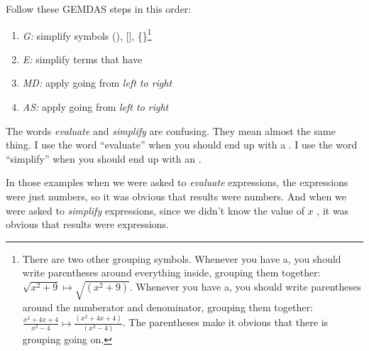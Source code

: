 \documentclass[fleqn,letterpaper,12pt,printwatermark=false]{memoir}
\begin{document}
\begin{myKeyConcepts}
    Follow these GEMDAS steps in this order:
    \begin{enumerate}
        \item {\Large\slshape G:} simplify  symbols (), [], \{\}\footnote{
            There are two other grouping symbols.
            Whenever you have a, you should write parentheses around everything inside, grouping them together:
            $\sqrt{x^2+9} \mapsto \sqrt{(x^2+9)} $.
            Whenever you have a, 
            you should write parentheses around the numberator and denominator, grouping them together:
            $\frac{x^2 + 4x + 4}{x^2-4} \mapsto \frac{(x^2 + 4x + 4)}{(x^2-4)}$.
            The parentheses make it obvious that there is grouping going on.
        }
        \item {\Large\slshape E:} simplify terms that have 
        \item {\Large\slshape MD:} apply  going from \emph{left to right}
        \item {\Large\slshape AS:} apply  going from \emph{left to right}
    \end{enumerate}
    The words \emph{evaluate} and \emph{simplify} are confusing. 
    They mean almost the same thing.
    I use the word ``evaluate'' when you should end up with a .
    I use the word ``simplify'' when you should end up with an .
\end{myKeyConcepts}





In those examples
when we were asked to \emph{evaluate} expressions,
the expressions were just numbers, 
so it was obvious that results were numbers.
And 
when we were asked to \emph{simplify} expressions,
since we didn't know the value of $x$ ,
it was obvious that results were expressions.
\end{document}

